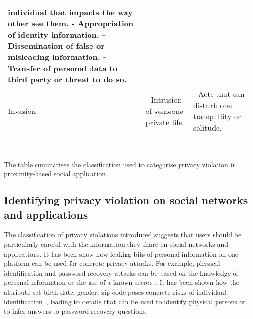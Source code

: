 \begin{table*}[ht]
\begin{tabular}{ | p{6em} || p{6em} || p{14em} |}
        individual that impacts the \newline
        way other see them. \newline
      - Appropriation of identity information. \newline
      - Dissemination of false or misleading \newline
        information. \newline
      - Transfer of personal data to third \newline
        party or threat to do so. \\
  \hline
Invasion		 		
    & - Intrusion of \newline
        someone \newline
        private life.
    & - Acts that can disturb one tranquillity \newline
        or solitude. \\
  \hline 
\end{tabular}
\label{tab:violations}
\\[2.5pt]
 \begin{flushleft}
The table summarises the classification used to categorise privacy violation in proximity-based social application.
\end{flushleft}
\end{table*}

\subsection{Identifying privacy violation on social networks and applications}
\noindent
The classification of privacy violations introduced suggests that users should be particularly careful with the information they share on social networks and applications. It has been show how leaking bits of personal information on one platform can be used for concrete privacy attacks. For example, physical identification and password recovery attacks can be based on the knowledge of personal information or the use of a known secret~\cite{irani-et-al}. It has been shown how the attribute set {birth-date, gender, zip code} poses concrete risks of individual identification~\cite{sweeney}, leading to details that can be used to identify physical persons or to infer answers to password recovery questions.

